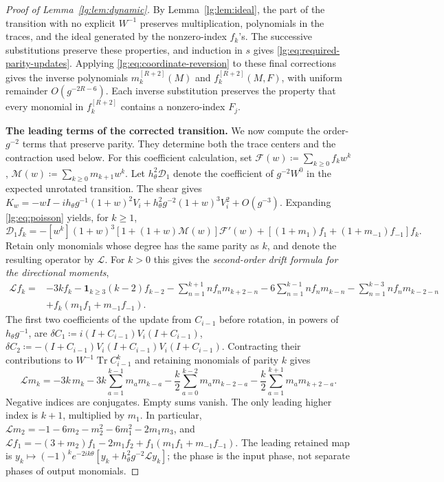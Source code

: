 \documentclass[11pt]{article}
\numberwithin{equation}{section}
\theoremstyle{remark}
\newcommand{\Tr}{\operatorname{Tr}}
\begin{document}
\begin{proof}[Proof of Lemma~\ref{lg:lem:dynamic}]
By Lemma~\ref{lg:lem:ideal}, the part of the transition with no
explicit $W^{-1}$ preserves multiplication, polynomials in the
traces, and the ideal generated by the nonzero-index $f_k$'s.
The successive substitutions preserve these properties, and induction
in $s$ gives \eqref{lg:eq:required-parity-updates}.
Applying \eqref{lg:eq:coordinate-reversion} to these final
corrections gives the inverse polynomials $m_k^{[R+2]}(M)$ and
$f_k^{[R+2]}(M,F)$, with
uniform remainder $O(g^{-2R-6})$. Each inverse substitution
preserves the property that every monomial in $f_k^{[R+2]}$
contains a nonzero-index $F_j$.

\noindent\textbf{The leading terms of the corrected transition.}
We now compute the order-$g^{-2}$ terms that preserve parity.
They determine both the trace centers and the contraction used below.
For this coefficient calculation, set
$\mathcal F(w)\coloneqq \sum_{k\ge0}f_k w^k$,
$\mathcal M(w)\coloneqq \sum_{k\ge0}m_{k+1}w^k$.
Let $h_\theta^2\mathcal D_1$ denote the coefficient of $g^{-2}W^0$
in the expected unrotated transition. The shear gives
$K_w=-wI-ih_\theta g^{-1}(1+w)^2V_i+h_\theta^2g^{-2}(1+w)^3V_i^2+O(g^{-3})$.
Expanding \eqref{lg:eq:poisson} yields, for $k\ge1$,
\[
 \mathcal D_1f_k
 =-[w^k](1+w)^3[1+(1+w)\mathcal M(w)]\mathcal F'(w)
   +[(1+m_1)f_1+(1+m_{-1})f_{-1}]f_k.
\]
Retain only monomials whose degree has the same parity as $k$,
and denote the resulting operator by $\mathcal L$. For $k>0$ this
gives the \emph{second-order drift formula for the directional moments},
\begin{equation}\label{lg:eq:center-corner}
 \begin{aligned}
 \mathcal Lf_k={}&-3kf_k-\mathbf1_{k\ge3}(k-2)f_{k-2}
 -\sum_{n=1}^{k+1}nf_nm_{k+2-n}
 -6\sum_{n=1}^{k-1}nf_nm_{k-n}
 -\sum_{n=1}^{k-3}nf_nm_{k-2-n}\\
 &+f_k(m_1f_1+m_{-1}f_{-1}).
 \end{aligned}
\end{equation}
The first two coefficients of the update from $C_{i-1}$ before rotation,
in powers of $h_\theta g^{-1}$, are
$\delta C_1\coloneqq i(I+C_{i-1})V_i(I+C_{i-1})$,
$\delta C_2\coloneqq -(I+C_{i-1})V_i(I+C_{i-1})V_i(I+C_{i-1})$.
Contracting their contributions to $W^{-1}\Tr C_{i-1}^k$ and retaining
monomials of parity $k$ gives
\begin{equation}\label{lg:eq:center-trace}
 \mathcal Lm_k=-3k\,m_k-3k\sum_{a=1}^{k-1}m_am_{k-a}
 -\frac k2\sum_{a=0}^{k-2}m_am_{k-2-a}
 -\frac k2\sum_{a=1}^{k+1}m_am_{k+2-a}.
\end{equation}
Negative indices are conjugates. Empty sums vanish.
The only leading higher index is $k+1$, multiplied by $m_1$.
In particular,
$\mathcal Lm_2=-1-6m_2-m_2^2-6m_1^2-2m_1m_3$,
and $\mathcal Lf_1=-(3+m_2)f_1-2m_1f_2+
 f_1(m_1f_1+m_{-1}f_{-1})$.
The leading retained map is
$y_k\mapsto (-1)^ke^{-2ik\theta}[y_k+h_\theta^2g^{-2}\mathcal Ly_k]$;
the phase is the input phase, not separate phases of output monomials.


\end{proof}
\end{document}
